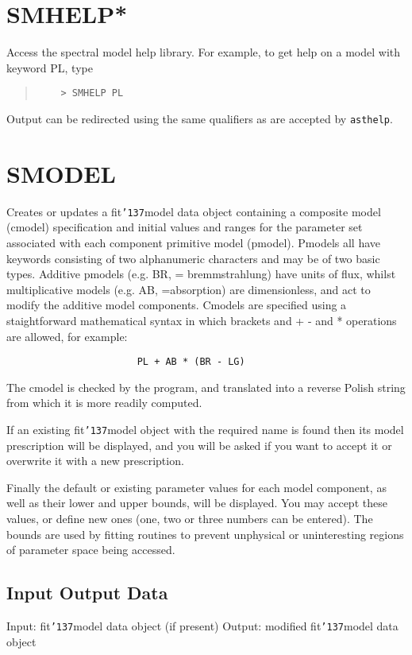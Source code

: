 \documentclass{book}
\renewcommand{\_}{{\tt\char'137}}     %
\begin{document}
\section{SMHELP*}
Access the spectral model help library. For example, to get help
on a model with keyword PL, type
\begin{quote}\begin{verbatim}
    > SMHELP PL
\end{verbatim}\end{quote}
Output can be redirected using the same qualifiers as are accepted
by {\tt asthelp}.

\section{SMODEL}
Creates or updates a fit\_model data object containing a composite
model (cmodel) specification and initial values and ranges for
the parameter set associated with each component primitive model
(pmodel). Pmodels all have keywords consisting of two
alphanumeric characters and may be of two basic types. Additive
pmodels (e.g. BR, = bremmstrahlung) have units of flux, whilst
multiplicative models (e.g. AB, =absorption) are dimensionless,
and act to modify the additive model components. Cmodels are
specified using a staightforward mathematical syntax in which
brackets and + - and * operations are allowed, for example:
\begin{verbatim}
                       PL + AB * (BR - LG)
\end{verbatim}
The cmodel is checked by the program, and translated into a
reverse Polish string from which it is more readily computed.

If an existing fit\_model object with the required name is found
then its model prescription will be displayed, and you will be
asked if you want to accept it or overwrite it with a new
prescription.

Finally the default or existing parameter values for each model
component, as well as their lower and upper bounds, will be
displayed. You may accept these values, or define new ones (one,
two or three numbers can be entered). The bounds are used by
fitting routines to prevent unphysical or uninteresting regions
of parameter space being accessed.

\subsection{Input Output Data}
Input: fit\_model data object (if present)
Output: modified fit\_model data object
\end{document}
